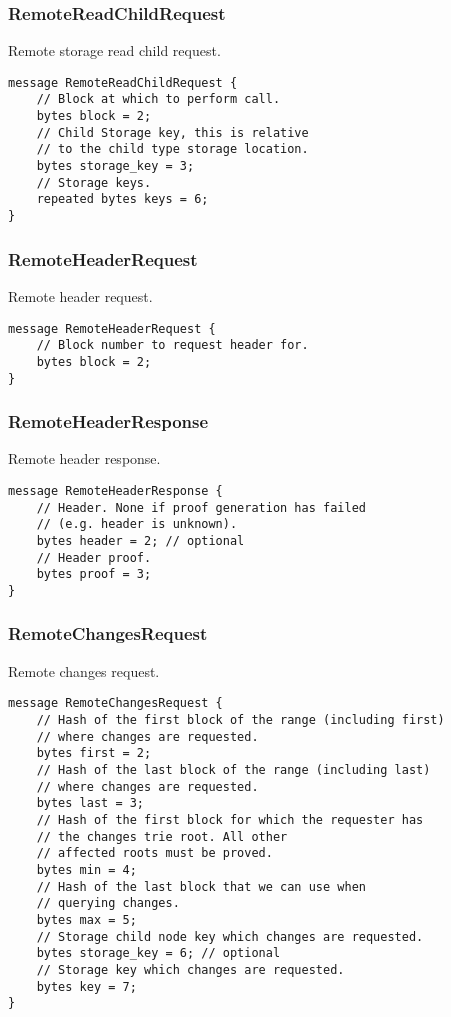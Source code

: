 \documentclass{book}
\begin{document}
\subsubsection{RemoteReadChildRequest}

Remote storage read child request.

\begin{lstlisting}[frame=single]
message RemoteReadChildRequest {
	// Block at which to perform call.
	bytes block = 2;
	// Child Storage key, this is relative
	// to the child type storage location.
	bytes storage_key = 3;
	// Storage keys.
	repeated bytes keys = 6;
}
\end{lstlisting}

\subsubsection{RemoteHeaderRequest}

Remote header request.

\begin{lstlisting}[frame=single]
message RemoteHeaderRequest {
	// Block number to request header for.
	bytes block = 2;
}
\end{lstlisting}

\subsubsection{RemoteHeaderResponse}

Remote header response.

\begin{lstlisting}[frame=single]
message RemoteHeaderResponse {
    // Header. None if proof generation has failed
    // (e.g. header is unknown).
	bytes header = 2; // optional
	// Header proof.
	bytes proof = 3;
}
\end{lstlisting}

\subsubsection{RemoteChangesRequest}

Remote changes request.

\begin{lstlisting}[frame=single]
message RemoteChangesRequest {
    // Hash of the first block of the range (including first)
    // where changes are requested.
	bytes first = 2;
    // Hash of the last block of the range (including last)
    // where changes are requested.
	bytes last = 3;
    // Hash of the first block for which the requester has
    // the changes trie root. All other
	// affected roots must be proved.
	bytes min = 4;
    // Hash of the last block that we can use when
    // querying changes.
	bytes max = 5;
	// Storage child node key which changes are requested.
	bytes storage_key = 6; // optional
	// Storage key which changes are requested.
	bytes key = 7;
}
\end{lstlisting}
\end{document}
